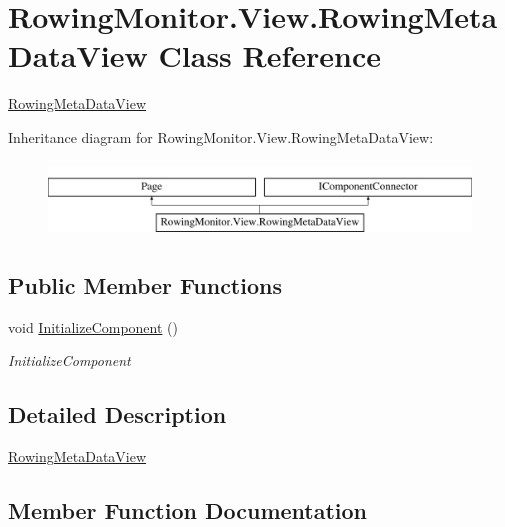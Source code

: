 \hypertarget{class_rowing_monitor_1_1_view_1_1_rowing_meta_data_view}{}\section{Rowing\+Monitor.\+View.\+Rowing\+Meta\+Data\+View Class Reference}
\label{class_rowing_monitor_1_1_view_1_1_rowing_meta_data_view}


\hyperlink{class_rowing_monitor_1_1_view_1_1_rowing_meta_data_view}{Rowing\+Meta\+Data\+View}  


Inheritance diagram for Rowing\+Monitor.\+View.\+Rowing\+Meta\+Data\+View\+:\begin{figure}[H]
\begin{center}
\leavevmode
\includegraphics[height=2.000000cm]{class_rowing_monitor_1_1_view_1_1_rowing_meta_data_view}
\end{center}
\end{figure}
\subsection*{Public Member Functions}
\begin{DoxyCompactItemize}
\item 
void \hyperlink{class_rowing_monitor_1_1_view_1_1_rowing_meta_data_view_a3d445692062269ce977812772d5c4d97}{Initialize\+Component} ()
\begin{DoxyCompactList}\small\item\em Initialize\+Component \end{DoxyCompactList}\end{DoxyCompactItemize}


\subsection{Detailed Description}
\hyperlink{class_rowing_monitor_1_1_view_1_1_rowing_meta_data_view}{Rowing\+Meta\+Data\+View} 



\subsection{Member Function Documentation}
\mbox{\label{class_rowing_monitor_1_1_view_1_1_rowing_meta_data_view_a3d445692062269ce977812772d5c4d97}} 
